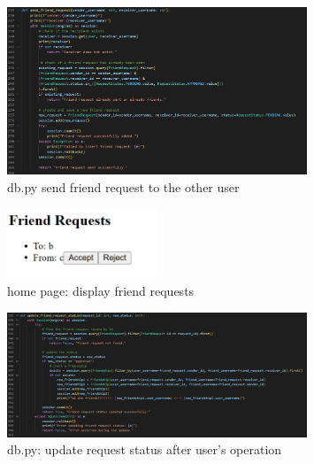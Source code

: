 \documentclass[12pt]{article}
\begin{document}
        \begin{figure}[H]
                \centering
                \includegraphics[width=0.8\textwidth]{zzrgraphs/db_send_friend_request.png}
                \caption{db.py send friend request to the other user}
                \label{sendfriendrequest}
            \end{figure}

        \begin{figure}[H]
                \centering
                \includegraphics[width=0.4\textwidth]{zzrgraphs/display_friendrequests.png}
                \caption{home page: display friend requests}
                \label{twobuttons}
            \end{figure}

        \begin{figure}[H]
                \centering
                \includegraphics[width=0.8\textwidth]{zzrgraphs/db_update_request_status.png}
                \caption{db.py: update request status after user's operation}
                \label{updatestatus}
            \end{figure}
\end{document}

